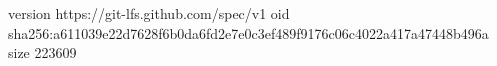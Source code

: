 version https://git-lfs.github.com/spec/v1
oid sha256:a611039e22d7628f6b0da6fd2e7e0c3ef489f9176c06c4022a417a47448b496a
size 223609
